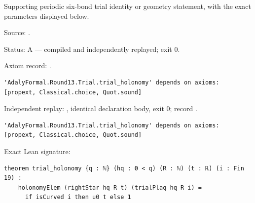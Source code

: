 \begin{theorem}[bp-409]
\label{bp-409}
\leanok
Supporting periodic six-bond trial identity or geometry statement, with the exact parameters displayed below.

\par Source: \texttt{}.
\par Status: A — compiled and independently replayed; exit 0.
\par Axiom record: \texttt{}.
\begin{verbatim}
'AdalyFormal.Round13.Trial.trial_holonomy' depends on axioms: [propext, Classical.choice, Quot.sound]
\end{verbatim}
\par Independent replay: \texttt{}, identical declaration body, exit 0; record \texttt{}.
\begin{verbatim}
'AdalyFormal.Round13.Trial.trial_holonomy' depends on axioms: [propext, Classical.choice, Quot.sound]
\end{verbatim}
\par Exact Lean signature:
\begin{verbatim}
theorem trial_holonomy {q : ℕ} (hq : 0 < q) (R : ℕ) (t : ℝ) (i : Fin 19) :
    holonomyElem (rightStar hq R t) (trialPlaq hq R i) =
      if isCurved i then uθ t else 1
\end{verbatim}
\end{theorem}

